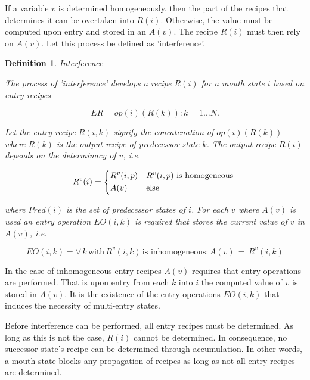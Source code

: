 \documentclass[12pt,a4paper]{scrartcl}
\newtheorem{definition}{Definition}
\begin{document}
If a variable $v$ is determined homogeneously, then the part of the recipes
that determines it can be overtaken into $R(i)$. Otherwise, the value must be
computed upon entry and stored in an $A(v)$. The recipe $R(i)$ must then rely
on $A(v)$. Let this process be defined as 'interference'.

\begin{definition}
Interference

The process of 'interference' develops a recipe $R(i)$ for a mouth state
$i$ based on entry recipes 

\begin{equation}
              ER = { op(i)(R(k)): k = 1...N }. 
\end{equation}
              
Let the entry recipe $R(i,k)$ signify the concatenation of $op(i)(R(k))$
where $R(k)$ is the output recipe of predecessor state $k$. The output
recipe $R(i)$ depends on the determinacy of $v$, i.e. 
          
\begin{equation}
    R^v(i) = \begin{dcases*}
              R^v(i,p) & $R^v(i,p)$ is homogeneous \\
              A(v)     & else
             \end{dcases*}
\end{equation}

where $Pred(i)$ is the set of predecessor states of $i$. For each $v$ where
$A(v)$ is used an entry operation $EO(i,k)$ is required that stores the current
value of $v$ in $A(v)$, i.e.

\begin{equation}
    EO(i,k) = { \forall\,k\,\mbox{with}\,R^v(i,k)\,\mbox{is inhomogeneous}: A(v)\,=\,R^v(i,k) }
\end{equation}

\end{definition}

In the case of inhomogeneous entry recipes $A(v)$ requires that entry
operations are performed.  That is upon entry from each $k$ into $i$ the
computed value of $v$ is stored in $A(v)$.  It is the existence of the entry
operations $EO(i,k)$ that induces the necessity of multi-entry states.  

Before interference can be performed, all entry recipes must be determined.  As
long as this is not the case, $R(i)$ cannot be determined. In consequence, no
successor state's recipe can be determined through accumulation. In other
words,  a mouth state blocks any propagation of recipes as long as not all
entry recipes are determined. 
\end{document}
